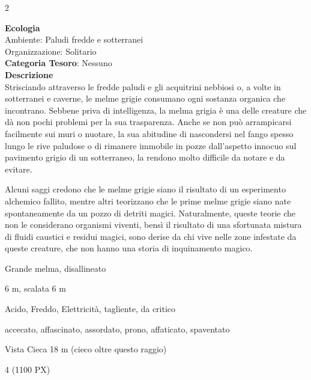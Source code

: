 \begin{multicols}{2}
{\textbf{Ecologia}\\
Ambiente: Paludi fredde e sotterranei\\
Organizzazione: Solitario\\
\textbf{Categoria Tesoro}: Nessuno\\
\textbf{Descrizione}\\
Strisciando attraverso le fredde paludi e gli acquitrini nebbiosi o, a volte in sotterranei e caverne, le melme grigie consumano ogni sostanza organica che incontrano. Sebbene priva di intelligenza, la melma grigia è una delle creature che dà non pochi problemi per la sua trasparenza. Anche se non può arrampicarsi facilmente sui muri o nuotare, la sua abitudine di nascondersi nel fango spesso lungo le rive paludose o di rimanere immobile in pozze dall'aspetto innocuo sul pavimento grigio di un sotterraneo, la rendono molto difficile da notare e da evitare.

Alcuni saggi credono che le melme grigie siano il risultato di un esperimento alchemico fallito, mentre altri teorizzano che le prime melme grigie siano nate spontaneamente da un pozzo di detriti magici. Naturalmente, queste teorie che non le considerano organismi viventi, bensì il risultato di una sfortunata mistura di fluidi caustici e residui magici, sono derise da chi vive nelle zone infestate da queste creature, che non hanno una storia di inquinamento magico.

\begin{description}[noitemsep, topsep=0pt, parsep=0pt, partopsep=0pt, itemsep=1pt, leftmargin=2.35cm,  labelwidth=2.2cm, itemindent=0cm, listparindent=0pt] %
\setlength{\baselineskip}{10pt}
\item[\textbf{Taglia/Tipo}] Grande melma, disallineato
\item[\textbf{Caratt.}] 
\item[\textbf{Punti Ferita}] 
\item[\textbf{Movimento}] 6 m, scalata 6 m
\item[\textbf{Tiri Salvez.}] 
\item[\textbf{Imm. Danni}] Acido, Freddo, Elettricità, tagliente, da critico
\item[\textbf{Immunità}] accecato, affascinato, assordato, prono, affaticato, spaventato
\item[\textbf{Sensi}] Vista Cieca 18 m (cieco oltre questo raggio)
\item[\textbf{Sfida}] 4 (1100 PX)
\end{description}
\smallskip

}
\end{multicols}
